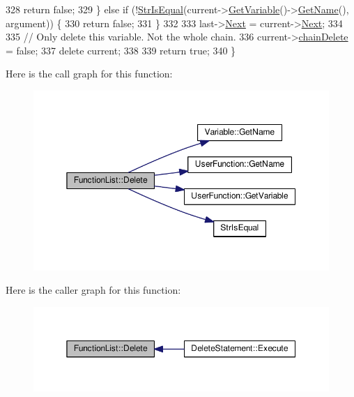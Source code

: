 \begin{DoxyCode}
328         \textcolor{keywordflow}{return} \textcolor{keyword}{false};
329     \} \textcolor{keywordflow}{else} \textcolor{keywordflow}{if} (!\hyperlink{clib_8h_a2a1f39d11cbbaac992d42e67557dac4b}{StrIsEqual}(current->\hyperlink{classUserFunction_a4580afdaa5124951a523de07f3c454a6}{GetVariable}()->\hyperlink{classVariable_accf221d35cec8a9707e84891b715fb6c}{GetName}(), argument)) \{
330         \textcolor{keywordflow}{return} \textcolor{keyword}{false};
331     \}
332 
333     last->\hyperlink{classUserFunction_a5463f575d2ed50c0dbe069ec2841a5c9}{Next} = current->\hyperlink{classUserFunction_a5463f575d2ed50c0dbe069ec2841a5c9}{Next};
334 
335     \textcolor{comment}{// Only delete this variable. Not the whole chain.}
336     current->\hyperlink{classUserFunction_a86fecef5db791181f188bef0d7898de0}{chainDelete} = \textcolor{keyword}{false};
337     \textcolor{keyword}{delete} current;
338 
339     \textcolor{keywordflow}{return} \textcolor{keyword}{true};
340 \}
\end{DoxyCode}


Here is the call graph for this function\+:
\nopagebreak
\begin{figure}[H]
\begin{center}
\leavevmode
\includegraphics[width=350pt]{d1/d79/classFunctionList_ae0e646a32dd118de74ab8d06f3bb775a_cgraph}
\end{center}
\end{figure}




Here is the caller graph for this function\+:
\nopagebreak
\begin{figure}[H]
\begin{center}
\leavevmode
\includegraphics[width=350pt]{d1/d79/classFunctionList_ae0e646a32dd118de74ab8d06f3bb775a_icgraph}
\end{center}
\end{figure}


